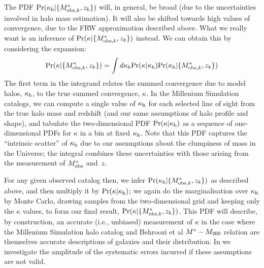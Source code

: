 \documentclass[useAMS,usenatbib]{mn2e}
\begin{document}
The PDF ${\rm Pr}(\kappa_{\rm h}|\{M^{*}_{{\rm obs},k},z_k\})$ will, in general, be broad (due to
the uncertainties involved in halo mass estimation). It will also be shifted
towards high values of convergence, due to the FRW approximation described
above. What we really want is an inference of ${\rm Pr}(\kappa|\{M^{*}_{{\rm obs},k},z_k\})$
instead. We can obtain this by considering the expansion:
\begin{equation}
{\rm Pr}(\kappa|\{M^{*}_{{\rm obs},k},z_k\}) = \int d\kappa_{\rm h} 
   {\rm Pr}(\kappa|\kappa_{\rm h}) {\rm Pr}(\kappa_{\rm h}|\{M^{*}_{{\rm obs},k},z_k\})
\label{eq:kappaconv}   
\end{equation}
The first term in the integrand relates the summed  convergence due to model
halos, $\kappa_{\rm h}$, to the true summed convergence, $\kappa$.  In the Millenium
Simulation catalogs, we can compute a single value of $\kappa_{\rm h}$ for each
selected line of sight from the true halo mass and redshift (and our same
assumptions of halo profile and shape), and tabulate the two-dimensional PDF
${\rm Pr}(\kappa|\kappa_{\rm h})$ as a sequence of one-dimensional PDFs for $\kappa$ in a
bin at fixed $\kappa_{\rm h}$. Note that this PDF captures the ``intrinsic scatter''
of $\kappa_{\rm h}$ due to our assumptions about the clumpiness of mass in the
Universe; the integral combines these uncertainties with those
arising from the measurement of $M^{*}_{\rm obs}$ and~$z$.

For any given observed catalog then, we infer
${\rm Pr}(\kappa_{\rm h}|\{M^{*}_{{\rm obs},k},z_k\})$ as described above, and then
multiply it by ${\rm Pr}(\kappa|\kappa_{\rm h})$; we
again do the marginalisation over $\kappa_{\rm h}$ by Monte Carlo, drawing samples
from the two-dimensional grid and keeping only the $\kappa$ values, to form
our final result, ${\rm Pr}(\kappa|\{M^{*}_{{\rm obs},k},z_k\})$. 
This PDF will describe, by construction, an accurate (i.e., unbiased)
measurement of $\kappa$ in the case where the Millenium Simulation halo
catalog and Behroozi et al $M^{*}-M_{200}$ relation are themselves accurate
descriptions of galaxies and their distribution. In  we
investigate the amplitude of the systematic errors incurred if these
assumptions are not valid.


\end{document}
